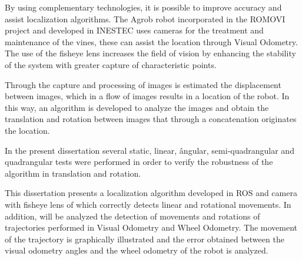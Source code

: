By using complementary technologies, it is possible to improve accuracy and assist localization algorithms. The Agrob robot incorporated in the ROMOVI project and developed in INESTEC uses cameras for the treatment and maintenance of the vines, these can assist the location through Visual Odometry.  The use of the fisheye lens increases the field of vision by enhancing the stability of the system with greater capture of characteristic points.

Through the capture and processing of images is estimated the displacement between images, which in a flow of images results in a location of the robot. In this way, an algorithm is developed to analyze the images and obtain the translation and rotation between images that through a concatenation originates the location.

In the present dissertation several static, linear, ângular, semi-quadrangular and quadrangular tests were performed in order to verify the robustness of the algorithm in translation and rotation.


This dissertation presents a localization algorithm developed in ROS and camera with fisheye lens of which correctly detects linear and rotational movements. In addition, will be analyzed the detection of movements and rotations of trajectories performed in Visual Odometry and Wheel Odometry. The movement of the trajectory is graphically illustrated and the error obtained between the visual odometry angles and the wheel odometry of the robot is analyzed.